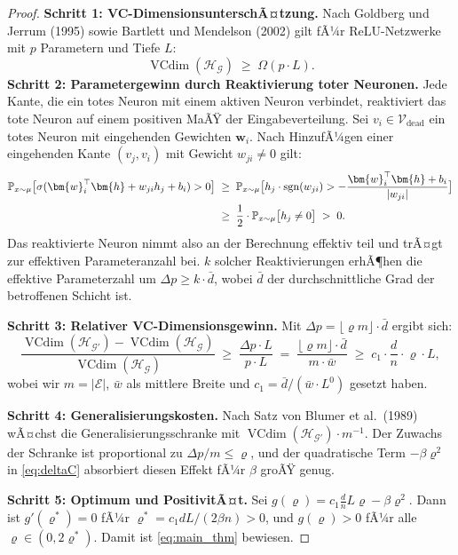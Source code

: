 ﻿\documentclass[12pt, a4paper, openany]{report}
\newcommand{\Prob}{\mathbb{P}}
\newcommand{\calG}{\mathcal{G}}
\newcommand{\calH}{\mathcal{H}}
\newcommand{\calV}{\mathcal{V}}
\newcommand{\calE}{\mathcal{E}}
\DeclareMathOperator{\sgn}{sgn}
\DeclareMathOperator{\VC}{VCdim}
\begin{document}
\begin{proof}
\textbf{Schritt 1: VC-DimensionsunterschÃ¤tzung.}
Nach Goldberg und Jerrum (1995) sowie Bartlett und Mendelson (2002) gilt
fÃ¼r ReLU-Netzwerke mit $p$ Parametern und Tiefe $L$:
\begin{equation}
  \label{eq:vc_base}
  \VC(\calH_{\calG}) \;\geq\; \Omega(p \cdot L).
\end{equation}
\textbf{Schritt 2: Parametergewinn durch Reaktivierung toter Neuronen.}
Jede Kante, die ein totes Neuron mit einem aktiven Neuron verbindet,
reaktiviert das tote Neuron auf einem positiven MaÃŸ der Eingabeverteilung.
Sei $v_i \in \calV_{\mathrm{dead}}$ ein totes Neuron mit eingehenden
Gewichten $\bm{w}_i$.  Nach HinzufÃ¼gen einer eingehenden Kante
$(v_j, v_i)$ mit Gewicht $w_{ji} \neq 0$ gilt:
\begin{align}
  \Prob_{x \sim \mu}\bigl[\sigma(\bm{w}_i^\top\bm{h} + w_{ji} h_j + b_i) > 0\bigr]
  &\;\geq\;
  \Prob_{x \sim \mu}\bigl[h_j \cdot \sgn(w_{ji}) > -\frac{\bm{w}_i^\top \bm{h} + b_i}{|w_{ji}|}\bigr] \notag \\
  &\;\geq\;
  \frac{1}{2} \cdot \Prob_{x \sim \mu}\bigl[h_j \neq 0\bigr]
  \;>\; 0.
\end{align}
Das reaktivierte Neuron nimmt also an der Berechnung effektiv teil und
trÃ¤gt zur effektiven Parameteranzahl bei.  $k$ solcher Reaktivierungen
erhÃ¶hen die effektive Parameterzahl um $\Delta p \geq k \cdot \bar{d}$,
wobei $\bar{d}$ der durchschnittliche Grad der betroffenen Schicht ist.

\textbf{Schritt 3: Relativer VC-Dimensionsgewinn.}
Mit $\Delta p = \lfloor \varrho m \rfloor \cdot \bar{d}$ ergibt sich:
\begin{equation}
  \label{eq:vc_gain}
  \frac{\VC(\calH_{\calG'}) - \VC(\calH_{\calG})}{\VC(\calH_{\calG})}
  \;\geq\;
  \frac{\Delta p \cdot L}{p \cdot L}
  \;=\;
  \frac{\lfloor\varrho m\rfloor \cdot \bar{d}}{m \cdot \bar{w}}
  \;\geq\;
  c_1 \cdot \frac{d}{n} \cdot \varrho \cdot L,
\end{equation}
wobei wir $m = |\calE|$, $\bar{w}$ als mittlere Breite und
$c_1 = \bar{d}/(\bar{w} \cdot L^0)$ gesetzt haben.

\textbf{Schritt 4: Generalisierungskosten.}
Nach Satz von Blumer et al.\ (1989) wÃ¤chst die Generalisierungsschranke
mit $\VC(\calH_{\calG'}) \cdot m^{-1}$.  Der Zuwachs der Schranke ist
proportional zu $\Delta p / m \leq \varrho$, und der quadratische Term
$-\beta\varrho^2$ in \eqref{eq:deltaC} absorbiert diesen Effekt fÃ¼r
$\beta$ groÃŸ genug.

\textbf{Schritt 5: Optimum und PositivitÃ¤t.}
Sei $g(\varrho) = c_1 \frac{d}{n} L \varrho - \beta \varrho^2$.
Dann ist $g'(\varrho^*) = 0$ fÃ¼r $\varrho^* = c_1 d L / (2\beta n) > 0$,
und $g(\varrho) > 0$ fÃ¼r alle $\varrho \in (0, 2\varrho^*)$.
Damit ist \eqref{eq:main_thm} bewiesen.
\end{proof}
\end{document}
